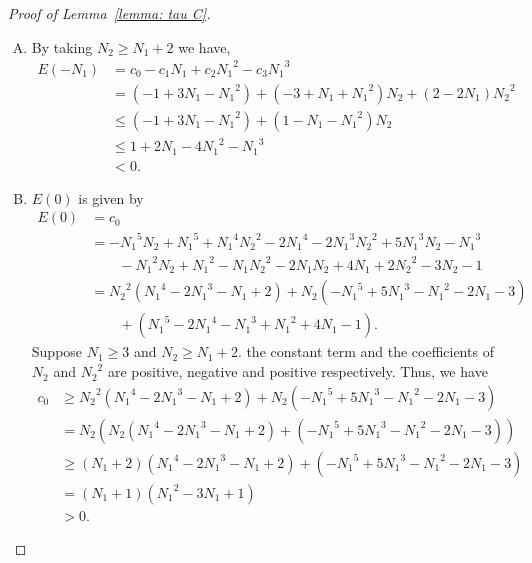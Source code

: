\documentclass{ws-ijnt}
\begin{document}
\begin{proof}[Proof of Lemma~\ref{lemma: tau C}]
\begin{enumerate}[A.]
			\item 
			By taking $N_2\geq N_1+2$ we have,
			\begin{align*}
				E(-N_1)
				&=c_0-c_1{N_1}+c_2{N_1}^2-c_3{N_1}^3 \\
				&=\left(-1+3{N_1}-{N_1}^2\right)+\left(-3+{N_1}+{N_1}^2\right){N_2}+\left(2-2{N_1}\right){N_2}^2 \\
				&\leq \left(-1+3{N_1}-{N_1}^2\right)+\left(1-{N_1}-{N_1}^2\right)N_2 \\
				&\leq 1+2{N_1}-4{N_1}^2-{N_1}^3 \\
				&<0.
			\end{align*}
			
			\item 
			$E(0)$ is given by
			\begin{align*}
				E(0)
				&= c_0\\
				&=-{N_1}^5N_2+{N_1}^5+{N_1}^4{N_2}^2-2{N_1}^4-2{N_1}^3{N_2}^2+5{N_1}^3N_2-{N_1}^3 \\
				&\qquad-{N_1}^2N_2+{N_1}^2-N_1{N_2}^2-2N_1N_2+4N_1+2{N_2}^2-3N_2-1 \\
				&=
				{N_2}^2({N_1}^4-2{N_1}^3-N_1+2)+N_2(-{N_1}^5+5{N_1}^3-{N_1}^2-2N_1-3)\\
				&\qquad+({N_1}^5-2{N_1}^4-{N_1}^3+{N_1}^2+4N_1-1).
			\end{align*}
			Suppose $N_1\geq 3$ and $N_2 \geq N_1+2$. the constant term and the coefficients of ${N_2}$ and ${N_2}^2$ are positive, negative and positive respectively. Thus, we have
			\begin{align*}
				c_0 &\geq {N_2}^2\left({N_1}^4-2{N_1}^3-N_1+2\right)+N_2\left(-{N_1}^5+5{N_1}^3-{N_1}^2-2N_1-3\right) \\
				&= N_2\left(N_2\left({N_1}^4-2{N_1}^3-N_1+2\right)+\left(-{N_1}^5+5{N_1}^3-{N_1}^2-2N_1-3\right)\right) \\
				&\geq  (N_1+2)\left({N_1}^4-2{N_1}^3-N_1+2\right)+\left(-{N_1}^5+5{N_1}^3-{N_1}^2-2N_1-3\right) \\
				&= (N_1+1)\left({N_1}^2-3N_1+1\right) \\
				&>0.
			\end{align*}
			

\end{enumerate}
\end{proof}
\end{document}
